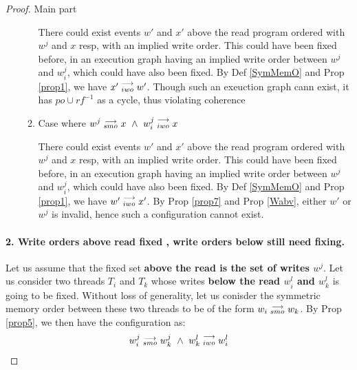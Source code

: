 \begin{proof}{Main part}
\begin{itemize}
\begin{enumerate}
                                There could exist events $w'$ and $x'$ above the read program ordered with $w^j$ and $x$ resp, with an implied write order. This could have been fixed before, in an execution graph having an implied write order between $w^j$ and $w_i^j$, which could have also been fixed.
                                By Def \ref{SymMemO} and Prop \ref{prop1}, we have $x'\stackrel{\longrightarrow}{_{iwo}}w'$.
                                Though such an exeuction graph cann exist, it has $po \cup rf^{-1}$ as a cycle, thus violating coherence
                            
                            \item Case where $w^j\stackrel{\longrightarrow}{_{smo}}x \ \wedge \ w_i^j\stackrel{\longrightarrow}{_{iwo}}x$
                            
                                There could exist events $w'$ and $x'$ above the read program ordered with $w^j$ and $x$ resp, with an implied write order. This could have been fixed before, in an execution graph having an implied write order between $w^j$ and $w_i^j$, which could have also been fixed.
                                By Def \ref{SymMemO} and Prop \ref{prop1}, we have $w'\stackrel{\longrightarrow}{_{iwo}}x'$. 
                                By Prop \ref{prop7} and Prop \ref{Wabv}, either $w'$ or $w^j$ is invalid, hence such a configuration cannot exist.

                        \end{enumerate}
                
                \end{itemize}


            \paragraph{2. Write orders above read fixed , write orders below still need fixing.}
                Let us assume that the fixed set \textbf{above the read is the set of writes $w^j$}. Let us consider two threads $T_i$ and $T_k$ whose writes \textbf{below the read $w_i^l$ and $w_k^l$} is going to be fixed. Without loss of generality, let us conisder the symmetric memory order between these two threads to be of the form $w_i\stackrel{\longrightarrow}{_{smo}}w_k$.  By Prop \ref{prop5}, we then have the configuration as:
                \begin{align*}
                    \reln{w_i^j}{smo}{w_k^j} \ \wedge \ \reln{w_k^l}{iwo}{w_i^l}
                \end{align*}


\end{proof}
